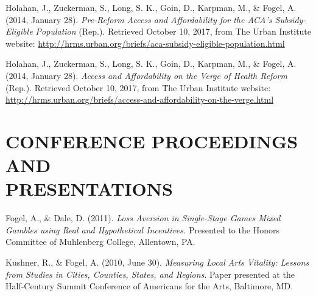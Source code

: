 \documentclass[margin, 10pt]{res} %
\begin{document}
\begin{resume}
Holahan, J., Zuckerman, S., Long, S. K., Goin, D., Karpman, M., \& Fogel, A. (2014, January 28). {\sl Pre-Reform Access and Affordability for the ACA's Subsidy-Eligible Population} (Rep.). Retrieved October 10, 2017, from The Urban Institute website: \url{http://hrms.urban.org/briefs/aca-subsidy-eligible-population.html}

Holahan, J., Zuckerman, S., Long, S. K., Goin, D., Karpman, M., \& Fogel, A. (2014, January 28). {\sl Access and Affordability on the Verge of Health Reform} (Rep.). Retrieved October 10, 2017, from The Urban Institute website: \url{http://hrms.urban.org/briefs/access-and-affordability-on-the-verge.html}



\section{\small\bf CONFERENCE PROCEEDINGS AND \\ PRESENTATIONS}
Fogel, A., \& Dale, D. (2011). {\sl Loss Aversion in Single-Stage Games Mixed Gambles using Real and Hypothetical Incentives.} Presented to the Honors Committee of Muhlenberg College, Allentown, PA.

Kushner, R., \& Fogel, A. (2010, June 30). {\sl Measuring Local Arts Vitality: Lessons from Studies in Cities, Counties, States, and Regions}. Paper presented at the Half-Century Summit Conference of Americans for the Arts, Baltimore, MD.



\end{resume}
\end{document}
